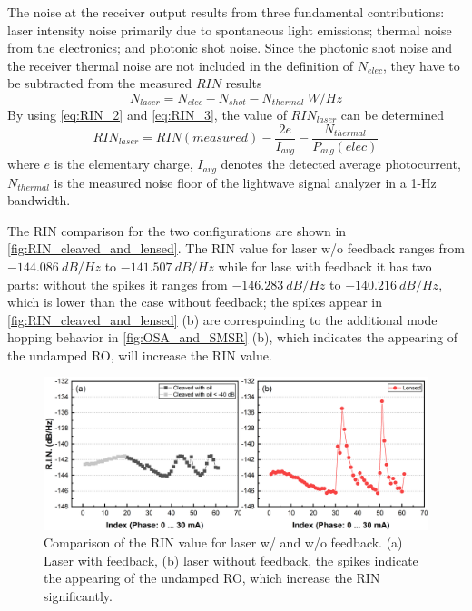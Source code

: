The noise at the receiver output results from three fundamental contributions: laser intensity noise primarily due to spontaneous light emissions; thermal noise from the electronics; and photonic shot noise. Since the photonic shot noise and the receiver thermal noise are not included in the definition of $N_{elec}$, they have to be subtracted from the measured $RIN$ results
\begin{equation}
    N_{laser}=N_{elec}-N_{shot}-N_{thermal} \ W/Hz
    \label{eq:RIN_3}
\end{equation}
By using \autoref{eq:RIN_2} and \autoref{eq:RIN_3}, the value of $RIN_{laser}$ can be determined
\begin{equation}
    RIN_{laser}=RIN(measured)-\frac{2e}{I_{avg}}-\frac{N_{thermal}}{P_{avg}(elec)}
    \label{eq:RIN_4}
\end{equation}
where $e$ is the elementary charge, $I_{avg}$ denotes the detected average photocurrent, $N_{thermal}$ is the measured noise floor of the lightwave signal analyzer in a 1-Hz bandwidth.

The RIN comparison for the two configurations are shown in \autoref{fig:RIN_cleaved_and_lensed}. The RIN value for laser w/o feedback ranges from $-144.086 \ dB/Hz$ to $-141.507 \ dB/Hz$ while for lase with feedback it has two parts: without the spikes it ranges from $-146.283 \ dB/Hz$ to $-140.216 \ dB/Hz$, which is lower than the case without feedback; the spikes appear in \autoref{fig:RIN_cleaved_and_lensed} (b) are correspoinding to the additional mode hopping behavior in \autoref{fig:OSA_and_SMSR} (b), which indicates the appearing of the undamped RO, will increase the RIN value.

\begin{figure}[ht]
    \centering
    \includegraphics[width=\linewidth]{figures/RIN_cleaved_and_lensed.png}
    \caption{Comparison of the RIN value for laser w/ and w/o feedback. (a) Laser with feedback, (b) laser without feedback, the spikes indicate the appearing of the undamped RO, which increase the RIN significantly.}
    \label{fig:RIN_cleaved_and_lensed}
\end{figure}

